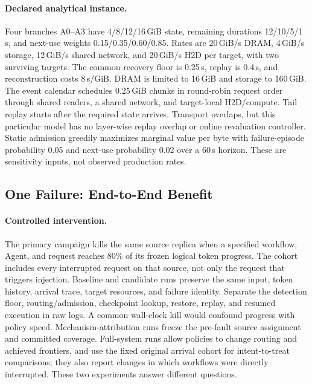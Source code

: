 \documentclass[sigplan,10pt,anonymous,nonacm]{acmart}
\begin{document}
\paragraph{Declared analytical instance.}
Four branches A0--A3 have 4/8/12/16\,GiB state, remaining durations
12/10/5/1\,s, and next-use weights 0.15/0.35/0.60/0.85. Rates are
20\,GiB/s DRAM, 4\,GiB/s storage, 12\,GiB/s shared network, and
20\,GiB/s H2D per target, with two surviving targets. The common recovery
floor is 0.25\,s, replay is 0.4\,s, and reconstruction costs 8\,s/GiB.
DRAM is limited to 16\,GiB and storage to 160\,GiB. The event calendar
schedules 0.25\,GiB chunks in round-robin request order through shared
readers, a shared network, and target-local H2D/compute. Tail replay starts
after the required state arrives. Transport overlaps, but this particular
model has no layer-wise replay overlap or online revaluation controller.
Static admission greedily maximizes marginal value per byte with
failure-episode probability 0.05 and next-use probability 0.02 over a
60\,s horizon. These are sensitivity inputs, not observed production rates.

\FloatBarrier
\subsection{One Failure: End-to-End Benefit}
\label{sec:eval-workflow}

\paragraph{Controlled intervention.}
The primary campaign kills the same source replica when a specified
workflow, Agent, and request reaches 80\% of its frozen logical token progress.
The cohort includes every interrupted request on that source, not only
the request that triggers injection. Baseline and candidate runs preserve
the same input, token history, arrival trace, target resources, and failure
identity. Separate the detection floor, routing/admission, checkpoint
lookup, restore, replay, and resumed execution in raw logs. A common
wall-clock kill would confound progress with policy speed.
Mechanism-attribution runs freeze the pre-fault source assignment and
committed coverage. Full-system runs allow policies to change routing
and achieved frontiers, and use the fixed original arrival cohort for
intent-to-treat comparisons; they also report changes in which workflows
were directly interrupted. These two experiments answer different questions.
\end{document}
